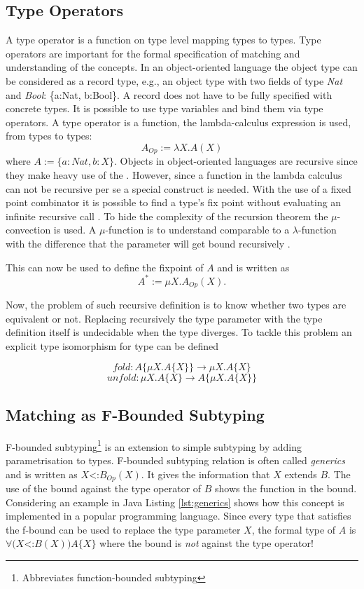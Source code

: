 \subsection{Type Operators}
 A type operator is a function on type level mapping types to
types. Type operators are important for the formal specification of
matching and understanding of the concepts. In an object-oriented language
the object type can be considered as a record type, e.g., an object type
with two fields of type \emph{Nat} and \emph{Bool}: \{a:Nat, b:Bool\}.
A record does not have to be fully specified with concrete types. It
is possible to use type variables and bind them via type operators.
A type operator is a function, the lambda-calculus expression is used,
from types to types: \[A_{Op} := \lambda X.A(X)
\] where $A := \{a:Nat, b:X\}$. Objects in object-oriented languages
are recursive since they make heavy use of the \mytype. However,
since a function in the lambda calculus can not be recursive
per se a special construct is needed. With the use of a fixed
point combinator it is possible to find a type's fix point without
evaluating an infinite recursive call \cite{gabriel_why_1988}. To
hide the complexity of the recursion theorem the $\mu$-convection is
used. A $\mu$-function is to understand comparable to a $\lambda$-function
with the difference that the parameter will get bound recursively
\cite{pierce_types_2002,simons_theory_2002-3}.

This can now be used to define the fixpoint of $A$ and is written as \[A^*
:= \mu X.A_{Op}(X).\]

Now, the problem of such recursive definition is to know whether two
types are equivalent or not. Replacing recursively the type parameter with
the type definition itself is undecidable when the type diverges. To tackle
this problem an explicit type isomorphism for type can be defined \cite{abadi_subtyping_1996}

\begin{defn}
	\label{def:foldUnfold}
	\[fold : A\{\mu X.A\{X\}\} \rightarrow \mu X.A\{X\}\]
	\[unfold : \mu X.A\{X\} \rightarrow A\{\mu X.A\{X\}\}\]
\end{defn}

\subsection{Matching as F-Bounded Subtyping}
F-bounded subtyping\footnote{Abbreviates function-bounded subtyping}
is an extension to simple subtyping by adding parametrisation to
types. F-bounded subtyping relation is often called \emph{generics}
and is written as $X$<:$B_{Op}(X)$. It gives the information that $X$
extends $B$. The use of the bound against the type operator of $B$
shows the function in the bound. Considering an example in Java
Listing \ref{lst:generics} shows how this concept is implemented in a popular
programming language. Since every type that satisfies the f-bound can
be used to replace the type parameter $X$, the formal type of $A$ is
$\forall(X$<:$B(X))A\{X\}$ where the bound is \emph{not} against the
type operator!

